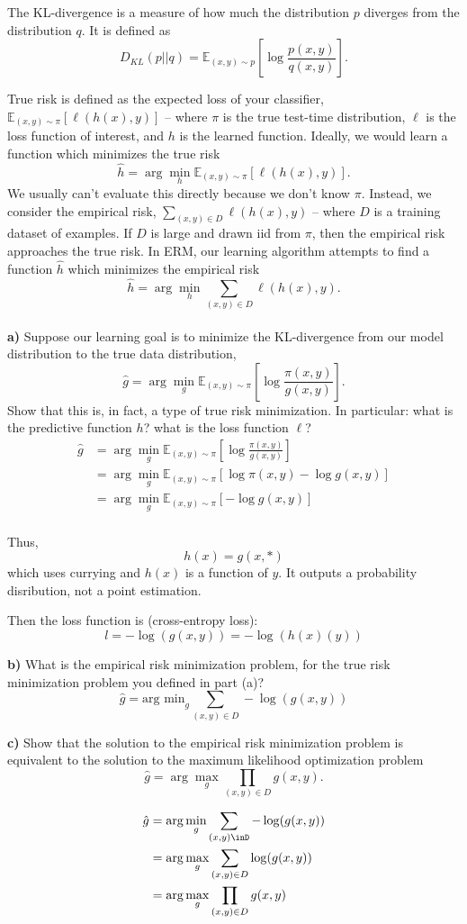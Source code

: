 \documentclass[a4paper]{article}
\begin{document}
The KL-divergence is a measure of how much the distribution $p$ diverges from the distribution $q$. It is defined as $$D_{KL}(p||q) = \mathbb{E}_{(x,y)\sim p} \left[\log\frac{p(x,y)}{q(x,y)}\right].$$

True risk is defined as the expected loss of your classifier, $\mathbb{E}_{(x,y)\sim\pi} \left[\ell(h(x),y)\right]$ -- where $\pi$ is the true test-time distribution, $\ell$ is the loss function of interest, and $h$ is the learned function. Ideally, we would learn a function which minimizes the true risk $$\hat h = \arg\min_h \mathbb{E}_{(x,y)\sim\pi} \left[\ell(h(x),y)\right].$$ We usually can't evaluate this directly because we don't know $\pi$. Instead, we consider the empirical risk, $\sum_{(x,y)\in D}\ell(h(x),y)$ -- where $D$ is a training dataset of examples. If $D$ is large and drawn iid from $\pi$, then the empirical risk approaches the true risk. In ERM, our learning algorithm attempts to find a function $\hat h$ which minimizes the empirical risk $$\hat h = \arg\min_h \sum_{(x,y)\in D}\ell(h(x),y).$$\\

\textbf{a)} Suppose our learning goal is to minimize the KL-divergence from our model distribution to the true data distribution, $$\hat g = \arg\min_g \mathbb{E}_{(x,y)\sim\pi} \left[\log\frac{\pi(x,y)}{g(x,y)}\right].$$ Show that this is, in fact, a type of true risk minimization. In particular: what is the predictive function $h$? what is the loss function $\ell$?\\

\begin{align*}
    \hat{g} &= \arg\min_g \mathbb{E}_{(x,y)\sim\pi}\left[\log\frac{\pi(x,y)}{g(x,y)}\right] \\
    &= \arg\min_g \mathbb{E}_{(x,y)\sim\pi}\left[\log\pi(x,y) - \log g(x,y)\right] \\
    &= \arg\min_g \mathbb{E}_{(x,y)\sim\pi}\left[- \log g(x,y)\right] \\
\end{align*}

Thus, 
$$h(x) = g(x,*)$$
which uses currying and $h(x)$ is a function of $y$. It outputs a probability disribution, not a point estimation. 

Then the loss function is (cross-entropy loss): 
$$l = -\log (g(x,y)) = -\log( h(x)(y))$$

\textbf{b)} What is the empirical risk minimization problem, for the true risk minimization problem you defined in part (a)?\\

$$\hat{g} = \text{arg min}_g \sum_{(x,y)\in D} -\log(g(x,y))$$

\textbf{c)} Show that the solution to the empirical risk minimization problem is equivalent to the solution to the maximum likelihood optimization problem $$\hat g = \arg\max_g \prod_{(x,y)\in D} g(x,y).$$

\begin{align*}
   \hat{g} &= \arg\min_g \sum_{(x,y)\inD} -\log(g(x,y))\\
   &= \arg\max_g\sum_{(x,y)\in D} \log(g(x,y))\\
   &= \arg \max_g \prod_{(x,y)\in D} g(x,y)
\end{align*}
\end{document}
